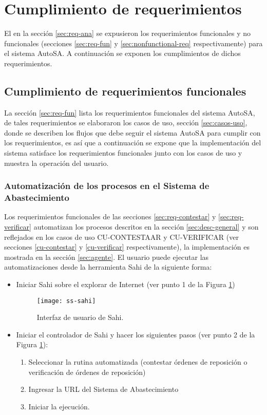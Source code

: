 \section{Cumplimiento de requerimientos}
El en la sección \ref{sec:req-ana} se expusieron los requerimientos funcionales y no funcionales (secciones \ref{sec:req-fun} y \ref{sec:nonfunctional-req} respectivamente) para el sistema AutoSA. A continuación se exponen los cumplimientos de dichos requerimientos.

\subsection{Cumplimiento de requerimientos funcionales}
La sección \ref{sec:req-fun} lista los requerimientos funcionales del sistema AutoSA, de tales requerimientos se elaboraron los casos de uso, sección \ref{sec:casos-uso}, donde se describen los flujos que debe seguir el sistema AutoSA para cumplir con los requerimientos, es así que a continuación se expone que la implementación del sistema satisface los requerimientos funcionales junto con los casos de uso y muestra la operación del usuario.

\subsubsection{Automatización de los procesos en el Sistema de Abastecimiento}
Los requerimientos funcionales de las secciones \ref{sec:req-contestar} y \ref{sec:req-verificar} automatizan los procesos descritos en la sección \ref{sec:desc-general} y son reflejados en los casos de uso CU-CONTESTAAR y CU-VERIFICAR (ver secciones \ref{cu-contestar} y \ref{cu-verificar} respectivamente), la implementación es mostrada en la sección \ref{sec:agente}. El usuario puede ejecutar las automatizaciones desde la herramienta Sahi de la siguiente forma:
\begin{itemize}
	\item Iniciar Sahi sobre el explorar de Internet (ver punto 1 de la Figura \ref{fig:ss-sahi})
	\begin{figure}[h]
		\centering
		\texttt{[image: ss-sahi]}
		\caption{Interfaz de usuario de Sahi.}
		\label{fig:ss-sahi}
	\end{figure}

	\item Iniciar el controlador de Sahi y hacer los siguientes pasos (ver punto 2 de la Figura \ref{fig:ss-sahi}):
	\begin{enumerate}
		\item Seleccionar la rutina automatizada (contestar órdenes de reposición o verificación de órdenes de reposición)
		\item Ingresar la URL del Sistema de Abastecimiento
		\item Iniciar la ejecución.
	\end{enumerate}
\end{itemize}

